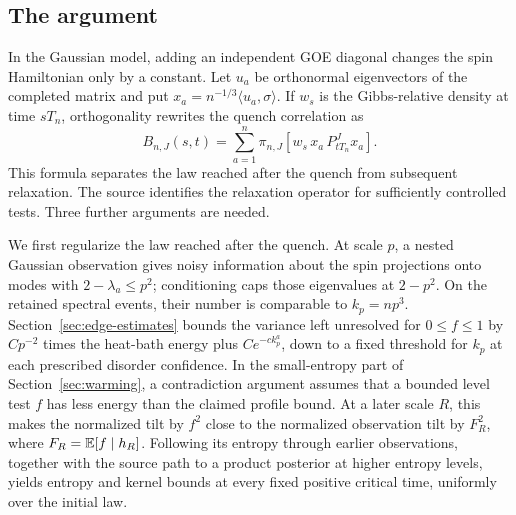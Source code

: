 \subsection{The argument}

In the Gaussian model, adding an independent GOE diagonal changes the spin
Hamiltonian only by a constant. Let \(u_a\) be orthonormal eigenvectors of
the completed matrix and put \(x_a=n^{-1/3}\langle u_a,\sigma\rangle\).
If \(w_s\) is the Gibbs-relative
density at time \(sT_n\), orthogonality rewrites the quench correlation as
\[
 B_{n,J}(s,t)=\sum_{a=1}^n
       \pi_{n,J}[w_s\,x_a\,P_{tT_n}^Jx_a].
\]
This formula separates the law reached after the quench from subsequent
relaxation. The source identifies the relaxation operator for sufficiently
controlled tests. Three further arguments are needed.

We first regularize the law reached after the quench. At scale \(p\), a
nested Gaussian observation gives noisy information about the spin
projections onto modes with \(2-\lambda_a\le p^2\); conditioning caps
those eigenvalues at \(2-p^2\). On the retained spectral events, their
number is comparable to \(k_p=np^3\).
Section~\ref{sec:edge-estimates} bounds the variance left unresolved for
\(0\le f\le1\) by \(Cp^{-2}\) times the heat-bath energy plus
\(Ce^{-ck_p^a}\), down to a fixed threshold for \(k_p\) at each prescribed
disorder confidence. In the small-entropy part of
Section~\ref{sec:warming}, a contradiction argument assumes that a bounded
level test \(f\) has less energy than the claimed profile bound. At a later
scale \(R\), this makes the normalized tilt by \(f^2\) close to the
normalized observation tilt by \(F_R^2\), where
\(F_R=\mathbb E[f\mid h_R]\). Following its entropy through earlier observations,
together with the source path to a product posterior at higher entropy
levels, yields entropy and kernel bounds at every fixed positive critical
time, uniformly over the initial law.

